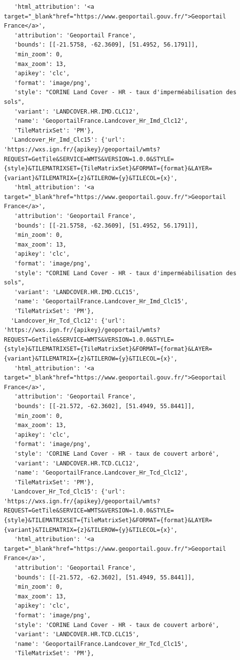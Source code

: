 \documentclass[
  letterpaper,
  DIV=11,
  numbers=noendperiod]{scrreprt}
\begin{document}
\begin{verbatim}
   'html_attribution': '<a target="_blank"href="https://www.geoportail.gouv.fr/">Geoportail France</a>',
   'attribution': 'Geoportail France',
   'bounds': [[-21.5758, -62.3609], [51.4952, 56.1791]],
   'min_zoom': 0,
   'max_zoom': 13,
   'apikey': 'clc',
   'format': 'image/png',
   'style': "CORINE Land Cover - HR - taux d'imperméabilisation des sols",
   'variant': 'LANDCOVER.HR.IMD.CLC12',
   'name': 'GeoportailFrance.Landcover_Hr_Imd_Clc12',
   'TileMatrixSet': 'PM'},
  'Landcover_Hr_Imd_Clc15': {'url': 'https://wxs.ign.fr/{apikey}/geoportail/wmts?REQUEST=GetTile&SERVICE=WMTS&VERSION=1.0.0&STYLE={style}&TILEMATRIXSET={TileMatrixSet}&FORMAT={format}&LAYER={variant}&TILEMATRIX={z}&TILEROW={y}&TILECOL={x}',
   'html_attribution': '<a target="_blank"href="https://www.geoportail.gouv.fr/">Geoportail France</a>',
   'attribution': 'Geoportail France',
   'bounds': [[-21.5758, -62.3609], [51.4952, 56.1791]],
   'min_zoom': 0,
   'max_zoom': 13,
   'apikey': 'clc',
   'format': 'image/png',
   'style': "CORINE Land Cover - HR - taux d'imperméabilisation des sols",
   'variant': 'LANDCOVER.HR.IMD.CLC15',
   'name': 'GeoportailFrance.Landcover_Hr_Imd_Clc15',
   'TileMatrixSet': 'PM'},
  'Landcover_Hr_Tcd_Clc12': {'url': 'https://wxs.ign.fr/{apikey}/geoportail/wmts?REQUEST=GetTile&SERVICE=WMTS&VERSION=1.0.0&STYLE={style}&TILEMATRIXSET={TileMatrixSet}&FORMAT={format}&LAYER={variant}&TILEMATRIX={z}&TILEROW={y}&TILECOL={x}',
   'html_attribution': '<a target="_blank"href="https://www.geoportail.gouv.fr/">Geoportail France</a>',
   'attribution': 'Geoportail France',
   'bounds': [[-21.572, -62.3602], [51.4949, 55.8441]],
   'min_zoom': 0,
   'max_zoom': 13,
   'apikey': 'clc',
   'format': 'image/png',
   'style': 'CORINE Land Cover - HR - taux de couvert arboré',
   'variant': 'LANDCOVER.HR.TCD.CLC12',
   'name': 'GeoportailFrance.Landcover_Hr_Tcd_Clc12',
   'TileMatrixSet': 'PM'},
  'Landcover_Hr_Tcd_Clc15': {'url': 'https://wxs.ign.fr/{apikey}/geoportail/wmts?REQUEST=GetTile&SERVICE=WMTS&VERSION=1.0.0&STYLE={style}&TILEMATRIXSET={TileMatrixSet}&FORMAT={format}&LAYER={variant}&TILEMATRIX={z}&TILEROW={y}&TILECOL={x}',
   'html_attribution': '<a target="_blank"href="https://www.geoportail.gouv.fr/">Geoportail France</a>',
   'attribution': 'Geoportail France',
   'bounds': [[-21.572, -62.3602], [51.4949, 55.8441]],
   'min_zoom': 0,
   'max_zoom': 13,
   'apikey': 'clc',
   'format': 'image/png',
   'style': 'CORINE Land Cover - HR - taux de couvert arboré',
   'variant': 'LANDCOVER.HR.TCD.CLC15',
   'name': 'GeoportailFrance.Landcover_Hr_Tcd_Clc15',
   'TileMatrixSet': 'PM'},

\end{verbatim}
\end{document}
